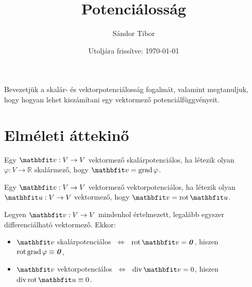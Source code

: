 \documentclass[lang=magyar]{math-handout}
\title{Potenciálosság}
\date{Utoljára frissítve: \today}
\author{Sándor Tibor}
\begin{document}
\allowdisplaybreaks

\maketitle

\vspace{1em}

\begin{summary}
  Bevezetjük a skalár- és vektorpotenciálosság fogalmát, valamint megtanuljuk,
  hogy hogyan lehet kiszámítani egy vektormező potenciálfüggvényeit.
\end{summary}

\vspace{-1em}

\section{Elméleti áttekinő}

\begin{definition}[Skalárpotenciálosság]
  Egy $\rvec v: V \rightarrow V$ vektormező skalárpotenciálos, ha létezik olyan
  $\varphi: V \rightarrow \mathbb R$ skalármező, hogy $\rvec v = \grad \varphi$.
\end{definition}

\begin{definition}[Vektorpotenciálosság]
  Egy $\rvec v: V \rightarrow V$ vektormező vektorpotenciálos, ha létezik olyan
  $\rvec u: V \rightarrow V$ vektormező, hogy $\rvec v = \rot \rvec u$.
\end{definition}

\begin{theorem}
  Legyen $\rvec v: V \rightarrow V$ mindenhol értelmezett, legalább egyszer
  differenciálható vektormező. Ekkor:
  \begin{itemize}
    \item $\rvec v$ skalárpotenciálos
          $\;\Leftrightarrow\;$
          $\rot \rvec v = \nvec$,
          hiszen $\operatorname{rot} \operatorname{grad} \varphi \equiv \text{\textbf{\textit{0}}}$,
    \item $\rvec v$ vektorpotenciálos
          $\;\Leftrightarrow\;$
          $\Div \rvec v = 0$,
          hiszen $\Div \rot \rvec u \equiv 0$.
  \end{itemize}
\end{theorem}
\end{document}
